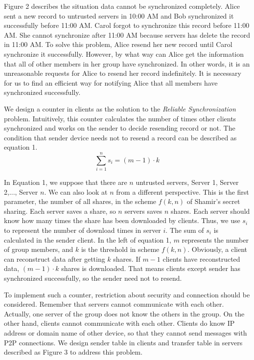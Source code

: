 \documentclass[twocolumn,10pt]{article}
\begin{document}
Figure 2 describes the situation data cannot be synchronized completely. Alice sent a new record to untrusted servers in 10:00 AM and Bob synchronized it successfully before 11:00 AM. Carol forgot to synchronize this record before 11:00 AM. She cannot synchronize after 11:00 AM because servers has delete the record in 11:00 AM. To solve this problem, Alice resend her new record until Carol synchronize it successfully. However, by what way can Alice get the information that all of other members in her group have synchronized. In other words, it is an unreasonable requests for Alice to resend her record indefinitely. It is necessary for us to find an efficient way for notifying Alice that all members have synchronized successfully.

We design a counter in clients as the solution to the \emph{Reliable Synchronization} problem. Intuitively, this counter calculates the number of times other clients synchronized and works on the sender to decide resending record or not. The condition that sender device needs not to resend a record can be described as equation 1.
\begin{equation}
\sum_{i=1}^{n}s_{i}=(m-1)\cdot k
\end{equation}

In Equation 1, we suppose that there are $n$ untrusted servers, Server 1, Server 2,..., Server $n$. We can also look at $n$ from a different perspective. This is the first parameter, the number of all shares, in the scheme $f(k, n)$ of Shamir's secret sharing. Each server saves a share, so $n$ servers saves $n$ shares. Each server should know how many times the share has been downloaded by clients. Thus, we use $s_i$ to represent the number of download times in server $i$. The sum of $s_i$ is calculated in the sender client. In the left of equation 1, $m$ represents the number of group members, and $k$ is the threshold in scheme $f(k, n)$. Obviously, a client can reconstruct data after getting $k$ shares. If $m-1$ clients have reconstructed data, $(m-1)\cdot k$ shares is downloaded. That means clients except sender has synchronized successfully, so the sender need not to resend.

To implement such a counter, restriction about security and connection should be considered. Remember that servers cannot communicate with each other. Actually, one server of the group does not know the others in the group. On the other hand, clients cannot communicate with each other. Clients do know IP address or domain name of other device, so that they cannot send messages with P2P connections. We design sender table in clients and transfer table in servers described as Figure 3 to address this problem. 
\end{document}
